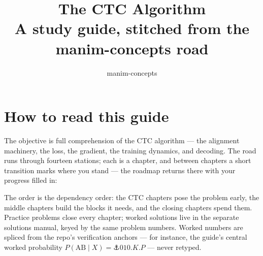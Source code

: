 \documentclass[11pt]{report}
\title{The CTC Algorithm\\[0.4em]
  \large A study guide, stitched from the manim-concepts road}
\author{manim-concepts}
\date{}
\begin{document}
\maketitle
\tableofcontents

\chapter*{How to read this guide}
The objective is full comprehension of the CTC algorithm — the alignment
machinery, the loss, the gradient, the training dynamics, and decoding.
The road runs through fourteen stations; each is a chapter, and between
chapters a short transition marks where you stand — the roadmap returns
there with your progress filled in:


\noindent The order is the dependency order: the CTC chapters pose the
problem early, the middle chapters build the blocks it needs, and the
closing chapters spend them. Practice problems close every chapter;
worked solutions live in the separate solutions manual, keyed by the
same problem numbers. Worked numbers are spliced from the repo's
verification anchors — for instance, the guide's central worked
probability $P(\mathrm{AB} \mid X) = \anchor{010.K.P}$ — never retyped.



\printbibliography[heading=bibintoc]
\end{document}
